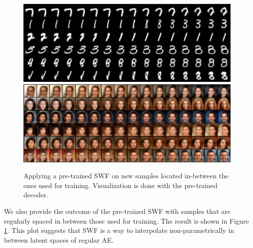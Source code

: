 \begin{figure}
\includegraphics[width=0.95\columnwidth]{figures/MNIST_interpolation_image_500.pdf}
\includegraphics[width=0.95\columnwidth]{figures/CelebA_interpolation_image_500.pdf}
\label{fig:interpolation}
\vspace{-5ptp}
\caption{Applying a pre-trained SWF on new samples located in-between the ones used for training. Visualization is done with the pre-trained decoder.}
\vspace{-10pt}
\end{figure}

We also provide the outcome of the pre-trained SWF with samples that are regularly spaced in between those used for training. The result is shown in Figure \ref{fig:interpolation}. This plot suggests that SWF is a way to interpolate non-parametrically in between latent spaces of regular AE.
























